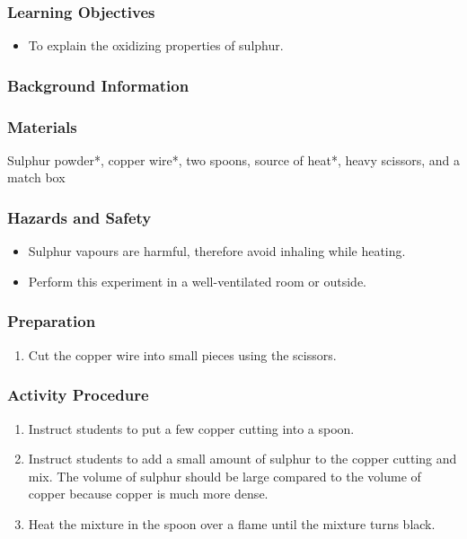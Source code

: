 \subsubsection*{Learning Objectives}
\begin{itemize}
\item{To explain the oxidizing properties of sulphur.}
\end{itemize}

\subsubsection*{Background Information}


\subsubsection*{Materials}
Sulphur powder*, copper wire*, two spoons, source of heat*, heavy scissors, and a match box

\subsubsection*{Hazards and Safety}
\begin{itemize}
\item{Sulphur vapours are harmful, therefore avoid inhaling while heating.}
\item{Perform this experiment in a well-ventilated room or outside.}
\end{itemize}

\subsubsection*{Preparation}
\begin{enumerate}
\item{Cut the copper wire into small pieces using the scissors.}
\end{enumerate}

\subsubsection*{Activity Procedure}
\begin{enumerate}
\item{Instruct students to put a few copper cutting into a spoon.}
\item{Instruct students to add a small amount of sulphur to the copper cutting and mix. The volume of sulphur should be large compared to the volume of copper because copper is much more dense.}
\item{Heat the mixture in the spoon over a flame until the mixture turns black.}
\end{enumerate}

